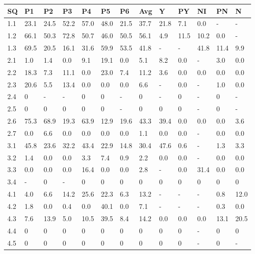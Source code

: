 \documentclass{IOS-Book-Article}
\begin{document}
\begin{table}[!ht]
    \centering
    \begin{tabular}{|l||l|l|l|l|l|l|l||l|l|l|l|l|}
    \hline
        SQ & P1 & P2 & P3 & P4 & P5 & P6 & Avg & Y & PY & NI & PN & N \\ \hline \hline
        1.1 & 23.1 & 24.5 & 52.2 & 57.0 & 48.0 & 21.5 & 37.7 & 21.8 & 7.1 & 0.0 & - & - \\ 
        1.2 & 66.1 & 50.3 & 72.8 & 50.7 & 46.0 & 50.5 & 56.1 & 4.9 & 11.5 & 10.2 & 0.0 & - \\ 
        1.3 & 69.5 & 20.5 & 16.1 & 31.6 & 59.9 & 53.5 & 41.8 & - & - & 41.8 & 11.4 & 9.9 \\ \hline
        2.1 & 1.0 & 1.4 & 0.0 & 9.1 & 19.1 & 0.0 & 5.1 & 8.2 & 0.0 & - & 3.0 & 0.0 \\ 
        2.2 & 18.3 & 7.3 & 11.1 & 0.0 & 23.0 & 7.4 & 11.2 & 3.6 & 0.0 & 0.0 & 0.0 & 0.0 \\ 
        2.3 & 20.6 & 5.5 & 13.4 & 0.0 & 0.0 & 0.0 & 6.6 & - & 0.0 & - & 1.0 & 0.0 \\ 
        2.4 & 0 & - & - & 0 & 0 & - & 0 & - & 0 & - & 0 & - \\ 
        2.5 & 0 & 0 & 0 & 0 & 0 & - & 0 & 0 & 0 & - & 0 & - \\ 
        2.6 & 75.3 & 68.9 & 19.3 & 63.9 & 12.9 & 19.6 & 43.3 & 39.4 & 0.0 & 0.0 & 0.0 & 3.6 \\ 
        2.7 & 0.0 & 6.6 & 0.0 & 0.0 & 0.0 & 0.0 & 1.1 & 0.0 & 0.0 & - & 0.0 & 0.0 \\ \hline
        3.1 & 45.8 & 23.6 & 32.2 & 43.4 & 22.9 & 14.8 & 30.4 & 47.6 & 0.6 & - & 1.3 & 3.3 \\ 
        3.2 & 1.4 & 0.0 & 0.0 & 3.3 & 7.4 & 0.9 & 2.2 & 0.0 & 0.0 & - & 0.0 & 0.0 \\ 
        3.3 & 0.0 & 0.0 & 0.0 & 16.4 & 0.0 & 0.0 & 2.8 & - & 0.0 & 31.4 & 0.0 & 0.0 \\ 
        3.4 & - & 0 & - & 0 & 0 & 0 & 0 & 0 & 0 & 0 & 0 & 0 \\ \hline
        4.1 & 4.0 & 6.6 & 14.2 & 25.6 & 22.3 & 6.3 & 13.2 & - & - & - & 0.8 & 12.0 \\ 
        4.2 & 1.8 & 0.0 & 0.4 & 0.0 & 40.1 & 0.0 & 7.1 & - & - & - & 0.3 & 0.0 \\
        4.3 & 7.6 & 13.9 & 5.0 & 10.5 & 39.5 & 8.4 & 14.2 & 0.0 & 0.0 & 0.0 & 13.1 & 20.5 \\ 
        4.4 & 0 & 0 & 0 & 0 & 0 & 0 & 0 & 0 & 0 & - & 0 & 0 \\ 
        4.5 & 0 & 0 & 0 & 0 & 0 & 0 & 0 & 0 & 0 & - & 0 & - \\ \hline

\end{tabular}
\end{table}
\end{document}
